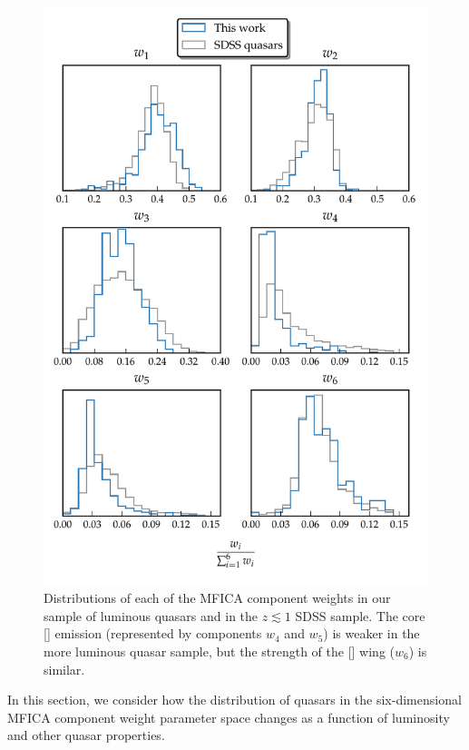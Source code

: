 \begin{figure}
\centering 
    \includegraphics[width=\textwidth]{figures/chapter04/mfica_component_weights.pdf} 
    \caption[{Distributions of each of the MFICA component weights in our sample of luminous quasars and in the $z \lesssim 1$ SDSS sample.}]{Distributions of each of the MFICA component weights in our sample of luminous quasars and in the $z \lesssim 1$ SDSS sample. The core [] emission (represented by components $w_4$ and $w_5$) is weaker in the more luminous quasar sample, but the strength of the [] wing ($w_6$) is similar. }     
    \label{fig:mfica_component_weights}
\end{figure}

In this section, we consider how the distribution of quasars in the six-dimensional MFICA component weight parameter space changes as a function of luminosity and other quasar properties. 

